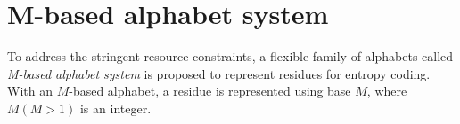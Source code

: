 \section{M-based alphabet system}

To address the stringent resource constraints, a flexible family of alphabets called \emph{\textcolor[rgb]{1,0,0}{M-based alphabet system}} is proposed to represent residues for entropy coding. With an $M$-based alphabet, a residue is represented using \textcolor[rgb]{1,0,0}{base $M$}, where $M(M>1)$ is an integer. 
